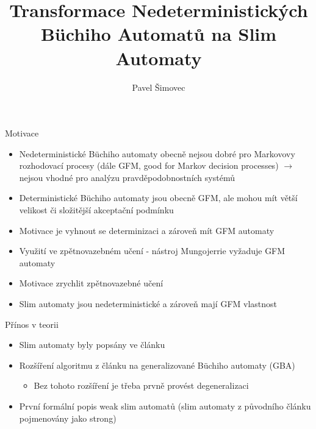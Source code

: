 \documentclass[
]{beamer}
\title[Slim Automata]{Transformace Nedeterministických Büchiho Automatů na Slim Automaty}
\author[P. Šimovec]{Pavel Šimovec\texorpdfstring{\\}{, }}
\institute[FI MU]{Fakulta Informatiky, Masarykova Univerzita}
\date{\formatdate{30}{6}{2021}}
\begin{document}
	
	\begin{frame}[plain]
		\maketitle
	\end{frame}
	
	
	\begin{frame}{Motivace}
		\begin{itemize}
			\pause
			\item Nedeterministické Büchiho automaty obecně nejsou \alert{dobré pro Markovovy rozhodovací procesy} (dále \alert{GFM}, good for Markov decision processes) $\rightarrow$ nejsou vhodné pro analýzu pravděpodobnostních systémů
			\pause
			\item Deterministické Büchiho automaty jsou obecně GFM, ale mohou mít větší velikost či složitější akceptační podmínku
			\pause
			\item Motivace je vyhnout se determinizaci a zároveň mít GFM automaty
			\pause
			\item Využití ve zpětnovazebném učení - nástroj \alert{Mungojerrie} vyžaduje GFM automaty
			\pause
			\item Motivace zrychlit zpětnovazebné učení
			\pause
			\item Slim automaty jsou nedeterministické a zároveň mají GFM vlastnost
		\end{itemize}
	\end{frame}

	\begin{frame}{Přínos v teorii}
		\begin{itemize}
			\pause
			\item Slim automaty byly popsány ve článku 
			\pause
			\item Rozšíření algoritmu z článku na \alert{generalizované} Büchiho automaty (GBA)
			\pause
			\begin{itemize}
			\item Bez tohoto rozšíření je třeba prvně provést degeneralizaci
			\end{itemize}
			\pause
			\item První formální popis \alert{weak slim automatů} (slim automaty z původního článku pojmenovány jako \alert{strong})
		\end{itemize}
	
	
	\end{frame}
	
\end{document}
